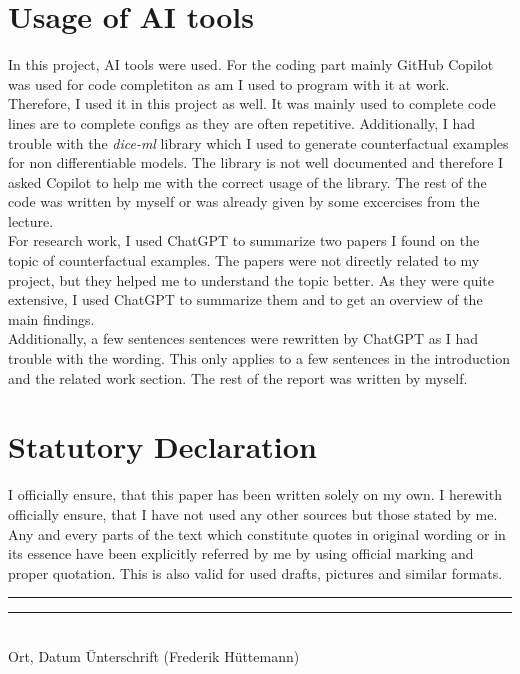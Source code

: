 \documentclass{article}
\begin{document}
\appendix

\section{Usage of AI tools}
In this project, AI tools were used. For the coding part mainly GitHub Copilot was used for code completiton as am I used to program with it at work. Therefore, I used it in this project as well. It was mainly used to complete code lines are to complete configs as they are often repetitive. Additionally, I had trouble with the \textit{dice-ml} library which I used to generate counterfactual examples for non differentiable models. The library is not well documented and therefore I asked Copilot to help me with the correct usage of the library. The rest of the code was written by myself or was already given by some excercises from the lecture.\\
For research work, I used ChatGPT to summarize two papers I found on the topic of counterfactual examples. The papers were not directly related to my project, but they helped me to understand the topic better. As they were quite extensive, I used ChatGPT to summarize them and to get an overview of the main findings.\\
Additionally, a few sentences sentences were rewritten by ChatGPT as I had trouble with the wording. This only applies to a few sentences in the introduction and the related work section. The rest of the report was written by myself.\\

\section{Statutory Declaration}
I officially ensure, that this paper has been written solely on my own. I herewith officially ensure, that I have not used any other sources but those stated by me. Any and every parts of the text which constitute quotes in original wording or in its essence have been explicitly referred by me by using official marking and proper quotation. This is also valid for used drafts, pictures and similar formats.\\
\vspace{3cm}

\begin{tabbing}
\rule{5cm}{0.4pt} \hspace{3cm} \rule{6cm}{0.4pt}\\
Ort, Datum \hspace{6.4cm} \= Unterschrift (Frederik Hüttemann)\\
\end{tabbing}
\end{document}
